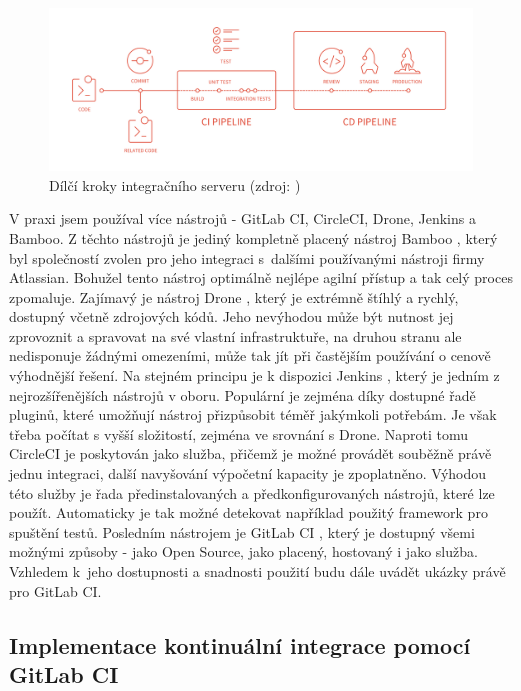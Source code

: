 \documentclass[FM,DP]{tulthesis}
\begin{document}
\begin{figure}[h]
\center
\includegraphics[width=\textwidth]{ci-steps.png}
\caption{Dílčí kroky integračního serveru (zdroj: \cite{gitlab})}
\label{ci-steps}
\end{figure}

V praxi jsem používal více nástrojů - GitLab CI, CircleCI, Drone, Jenkins a Bamboo. Z těchto nástrojů je
jediný kompletně placený nástroj Bamboo \cite{bamboo}, který byl společností zvolen pro jeho integraci s~dalšími 
používanými nástroji firmy Atlassian. Bohužel tento nástroj optimálně nejlépe agilní přístup a tak celý proces 
zpomaluje. Zajímavý je nástroj Drone \cite{drone}, který je extrémně štíhlý a rychlý, dostupný včetně zdrojových kódů. 
Jeho nevýhodou může být nutnost jej zprovoznit a spravovat na své vlastní infrastruktuře, na druhou stranu ale 
nedisponuje žádnými omezeními, může tak jít při častějším používání o cenově výhodnější řešení. Na stejném
principu je k dispozici Jenkins \cite{jenkins}, který je jedním z nejrozšířenějších nástrojů v oboru. Populární
je zejména díky dostupné řadě pluginů, které umožňují nástroj přizpůsobit téměř jakýmkoli potřebám. Je však třeba
počítat s vyšší složitostí, zejména ve srovnání s Drone. Naproti tomu CircleCI \cite{circle} je poskytován jako služba,
přičemž je možné provádět souběžně právě jednu integraci, další navyšování výpočetní kapacity je zpoplatněno. 
Výhodou této služby je řada předinstalovaných a předkonfigurovaných nástrojů, které lze použít. Automaticky
je tak možné detekovat například použitý framework pro spuštění testů. Posledním nástrojem je GitLab CI \cite{gitlab},
který je dostupný všemi možnými způsoby - jako Open Source, jako placený, hostovaný i jako služba. Vzhledem k~jeho
dostupnosti a snadnosti použití budu dále uvádět ukázky právě pro GitLab CI.

\subsection{Implementace kontinuální integrace pomocí GitLab CI}
\end{document}
